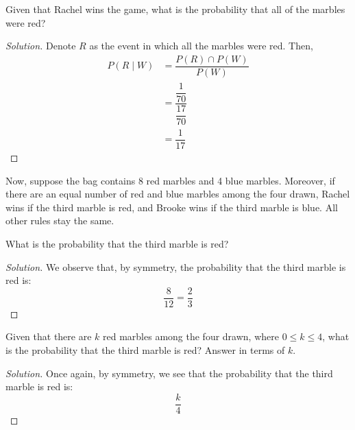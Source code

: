 \documentclass{article}
\newenvironment{solution}{\begin{proof}[Solution]}{\end{proof}}
\begin{document}
\begin{hw}
	Given that Rachel wins the game, what is the probability that all of the marbles were red?
\end{hw}
\begin{solution}
	Denote $R$ as the event in which all the marbles were red. Then,
	\begin{align*}
		P(R \mid W) &= \dfrac{P(R) \cap P(W)}{P(W)} \\
		&= \dfrac{\dfrac{1}{70}}{\dfrac{17}{70}} \\
		&= \dfrac{1}{17}
	\end{align*}
\end{solution}

Now, suppose the bag contains 8 red marbles and 4 blue marbles. Moreover, if there are an equal number of red and blue marbles among the four drawn, Rachel wins if the third marble is red, and Brooke wins if the third marble is blue. All other rules stay the same.
\begin{hw}
	What is the probability that the third marble is red?
\end{hw}
\begin{solution}
	We observe that, by symmetry, the probability that the third marble is red is:
	\begin{equation*}
		\dfrac{8}{12} = \dfrac{2}{3}
	\end{equation*}
\end{solution}

\begin{hw}
	Given that there are $k$ red marbles among the four drawn, where $0 \leq k \leq 4$, what is the probability that the third marble is red? Answer in terms of $k$.
\end{hw}
\begin{solution}
	Once again, by symmetry, we see that the probability that the third marble is red is:
	\begin{equation*}
		\dfrac{k}{4}
	\end{equation*}
\end{solution}
\end{document}
